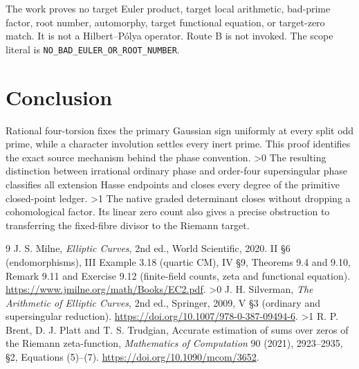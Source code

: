 \documentclass[10pt]{article}
\begin{document}
The work proves no target Euler product, target local arithmetic,
bad-prime factor, root number, automorphy, target functional equation,
or target-zero match. It is not a Hilbert--P\'olya operator. Route B is
not invoked. The scope literal is
\texttt{NO\_BAD\_EULER\_OR\_ROOT\_NUMBER}.
\fi

\section{Conclusion}
Rational four-torsion fixes the primary Gaussian sign uniformly at
every split odd prime, while a character involution settles every inert
prime. This proof identifies the exact source mechanism behind the
phase convention.
\ifnum\CRevisionRound>0
The resulting distinction between irrational ordinary phase and
order-four supersingular phase classifies all extension Hasse endpoints
and closes every degree of the primitive closed-point ledger.
\fi
\ifnum\CRevisionRound>1
The native graded determinant closes without dropping a cohomological
factor. Its linear zero count also gives a precise obstruction to
transferring the fixed-fibre divisor to the Riemann target.
\fi

\begin{thebibliography}{9}
 J. S. Milne, \emph{Elliptic Curves}, 2nd ed., World
Scientific, 2020. II \S6 (endomorphisms), III Example 3.18 (quartic CM),
IV \S9, Theorems 9.4 and 9.10, Remark 9.11 and Exercise 9.12
(finite-field counts, zeta and functional equation).
\url{https://www.jmilne.org/math/Books/EC2.pdf}.
\ifnum\CRevisionRound>0
 J. H. Silverman, \emph{The Arithmetic of Elliptic
Curves}, 2nd ed., Springer, 2009, V \S3 (ordinary and supersingular
reduction). \url{https://doi.org/10.1007/978-0-387-09494-6}.
\fi
\ifnum\CRevisionRound>1
 R. P. Brent, D. J. Platt and T. S. Trudgian,
Accurate estimation of sums over zeros of the Riemann zeta-function,
\emph{Mathematics of Computation} 90 (2021), 2923--2935,
\S2, Equations (5)--(7).
\url{https://doi.org/10.1090/mcom/3652}.
\fi
\end{thebibliography}
\end{document}
